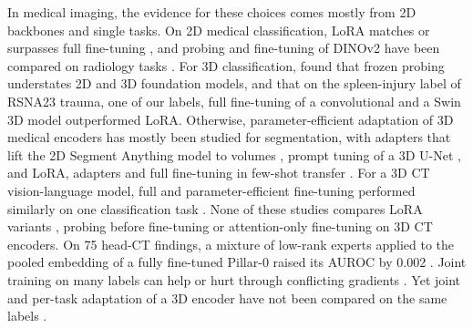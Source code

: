 In medical imaging, the evidence for these choices comes mostly from 2D backbones and single tasks. On 2D medical classification, LoRA matches or surpasses full fine-tuning \citep{dutt2024peft,zhu2024melo}, and probing and fine-tuning of DINOv2 \citep{oquab2023dinov2} have been compared on radiology tasks \citep{baharoon2023dinov2med}. For 3D classification, \citet{liu2025anymc3d} found that frozen probing understates 2D and 3D foundation models, and that on the spleen-injury label of RSNA23 trauma, one of our labels, full fine-tuning of a convolutional and a Swin 3D model outperformed LoRA. Otherwise, parameter-efficient adaptation of 3D medical encoders has mostly been studied for segmentation, with adapters that lift the 2D Segment Anything model \citep{kirillov2023sam} to volumes \citep{gong20243dsamadapter,chen2024masam,wu2025medsa}, prompt tuning of a 3D U-Net \citep{fischer2024prompttuning}, and LoRA, adapters and full fine-tuning in few-shot transfer \citep{silvarodriguez2025fseft,ly2026seapeft}. For a 3D CT vision-language model, full and parameter-efficient fine-tuning performed similarly on one classification task \citep{kartika2026hcc}. None of these studies compares LoRA variants \citep{liu2024dora,kalajdzievski2023rslora}, probing before fine-tuning \citep{kumar2022lpft} or attention-only fine-tuning \citep{touvron2022three} on 3D CT encoders. On 75 head-CT findings, a mixture of low-rank experts applied to the pooled embedding of a fully fine-tuned Pillar-0 raised its AUROC by 0.002 \citep{yoo2026molre}. Joint training on many labels can help \citep{kim2023ctan} or hurt through conflicting gradients \citep{yu2020pcgrad,zhao2023mtlreview}. Yet joint and per-task adaptation of a 3D encoder have not been compared on the same labels \citep{veenboer2025tapct,liu2025anymc3d}.

